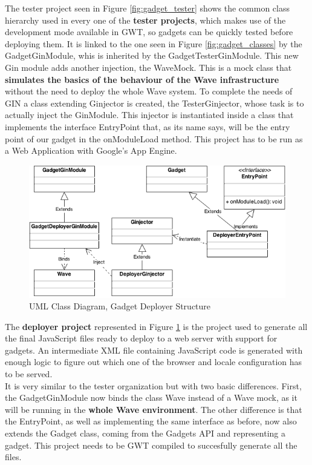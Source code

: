 The tester project seen in Figure \ref{fig:gadget_tester} shows the common class hierarchy used in every one of the \textbf{tester projects}, which makes use of the development mode available in GWT, so gadgets can be quickly tested before deploying them. It is linked to the one seen in Figure \ref{fig:gadget_classes} by the GadgetGinModule, whis is inherited by the GadgetTesterGinModule. This new Gin module adds another injection, the WaveMock. This is a mock class that \textbf{simulates the basics of the behaviour of the Wave infrastructure} without the need to deploy the whole Wave system. To complete the needs of GIN a class extending Ginjector is created, the TesterGinjector, whose task is to actually inject the GinModule. This injector is instantiated inside a class that implements the interface EntryPoint that, as its name says, will be the entry point of our gadget in the onModuleLoad method. This project has to be run as a Web Application with Google's App Engine.
\begin{figure}[H]
  \center
    \includegraphics[keepaspectratio, scale=0.5]{Media/Diagrams/Gadget/Deployer.png}
  \caption{UML Class Diagram, Gadget Deployer Structure}
  \label{fig:gadget_deployer}
\end{figure}
The \textbf{deployer project} represented in Figure \ref{fig:gadget_deployer} is the project used to generate all the final JavaScript files ready to deploy to a web server with support for gadgets. An intermediate XML file containing JavaScript code is generated with enough logic to figure out which one of the browser and locale configuration has to be served.\\[.2cm]
It is very similar to the tester organization but with two basic differences. First, the GadgetGinModule now binds the class Wave instead of a Wave mock, as it will be running in the \textbf{whole Wave environment}. The other difference is that the EntryPoint, as well as implementing the same interface as before, now also extends the Gadget class, coming from the Gadgets API and representing a gadget. This project needs to be GWT compiled to succesfully generate all the files.\\[.2cm]
